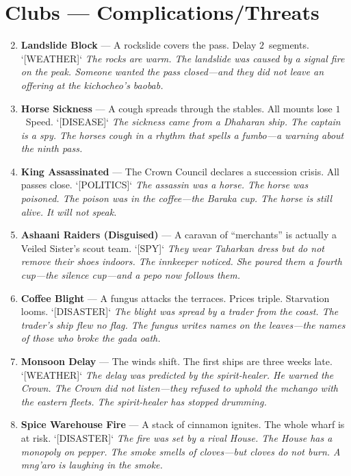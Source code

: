 \section*{Clubs --- Complications/Threats}
\label{sec:taharka-complications}
\begin{enumerate}
\setcounter{enumi}{1}
\item \textbf{Landslide Block} --- A rockslide covers the pass. Delay $2$~segments. `[WEATHER]`
  \hfill \textit{The rocks are warm. The landslide was caused by a signal fire on the peak. Someone wanted the pass closed---and they did not leave an offering at the \textit{kichocheo}'s baobab.}
\item \textbf{Horse Sickness} --- A cough spreads through the stables. All mounts lose $1$~Speed. `[DISEASE]`
  \hfill \textit{The sickness came from a Dhaharan ship. The captain is a spy. The horses cough in a rhythm that spells a \textit{fumbo}---a warning about the ninth pass.}
\item \textbf{King Assassinated} --- The Crown Council declares a succession crisis. All passes close. `[POLITICS]`
  \hfill \textit{The assassin was a horse. The horse was poisoned. The poison was in the coffee---the \textit{Baraka} cup. The horse is still alive. It will not speak.}
\item \textbf{Ashaani Raiders (Disguised)} --- A caravan of ``merchants'' is actually a Veiled Sister's scout team. `[SPY]`
  \hfill \textit{They wear Taharkan dress but do not remove their shoes indoors. The innkeeper noticed. She poured them a fourth cup---the silence cup---and a \textit{pepo} now follows them.}
\item \textbf{Coffee Blight} --- A fungus attacks the terraces. Prices triple. Starvation looms. `[DISASTER]`
  \hfill \textit{The blight was spread by a trader from the coast. The trader's ship flew no flag. The fungus writes names on the leaves---the names of those who broke the \textit{gada} oath.}
\item \textbf{Monsoon Delay} --- The winds shift. The first ships are three weeks late. `[WEATHER]`
  \hfill \textit{The delay was predicted by the spirit-healer. He warned the Crown. The Crown did not listen---they refused to uphold the \textit{mchango} with the eastern fleets. The spirit-healer has stopped drumming.}
\item \textbf{Spice Warehouse Fire} --- A stack of cinnamon ignites. The whole wharf is at risk. `[DISASTER]`
  \hfill \textit{The fire was set by a rival House. The House has a monopoly on pepper. The smoke smells of cloves---but cloves do not burn. A \textit{mng'aro} is laughing in the smoke.}

\end{enumerate}
